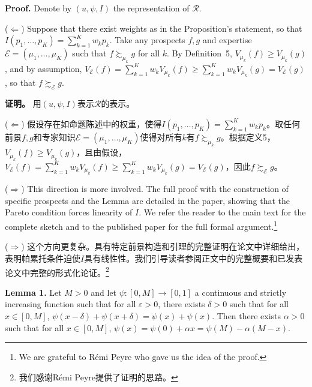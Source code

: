 \documentclass[12pt,a4paper]{article}
\newenvironment{original}
  {\par\noindent\ignorespaces}
  {\par}
\newenvironment{translation}
  {\par\noindent{\color{transblue}\ignorespaces}}
  {\par\medskip}
\begin{document}
\begin{original}
\textbf{Proof.} Denote by $(u, \psi, I)$ the representation of $\mathcal{R}$.

($\Leftarrow$) Suppose that there exist weights as in the Proposition's statement, so that $I(p_{1}, \dots, p_{K}) = \sum_{k=1}^{K} w_{k} p_{k}$. Take any prospects $f, g$ and expertise $\mathcal{E} = (\mu_{1}, \dots, \mu_{K})$ such that $f \succsim_{\mu_{k}} g$ for all $k$. By Definition~5, $V_{\mu_{k}}(f) \geq V_{\mu_{k}}(g)$, and by assumption, $V_{\mathcal{E}}(f) = \sum_{k=1}^{K} w_{k} V_{\mu_{k}}(f) \geq \sum_{k=1}^{K} w_{k} V_{\mu_{k}}(g) = V_{\mathcal{E}}(g)$, so that $f \succsim_{\mathcal{E}} g$.
\end{original}

\begin{translation}
\textbf{证明。} 用$(u, \psi, I)$表示$\mathcal{R}$的表示。

($\Leftarrow$) 假设存在如命题陈述中的权重，使得$I(p_{1}, \dots, p_{K}) = \sum_{k=1}^{K} w_{k} p_{k}$。取任何前景$f, g$和专家知识$\mathcal{E} = (\mu_{1}, \dots, \mu_{K})$使得对所有$k$有$f \succsim_{\mu_{k}} g$。根据定义5，$V_{\mu_{k}}(f) \geq V_{\mu_{k}}(g)$，且由假设，$V_{\mathcal{E}}(f) = \sum_{k=1}^{K} w_{k} V_{\mu_{k}}(f) \geq \sum_{k=1}^{K} w_{k} V_{\mu_{k}}(g) = V_{\mathcal{E}}(g)$，因此$f \succsim_{\mathcal{E}} g$。
\end{translation}

\begin{original}
($\Rightarrow$) This direction is more involved. The full proof with the construction of specific prospects and the Lemma are detailed in the paper, showing that the Pareto condition forces linearity of $I$. We refer the reader to the main text for the complete sketch and to the published paper for the full formal argument.\footnote{We are grateful to R\'{e}mi Peyre who gave us the idea of the proof.}
\end{original}

\begin{translation}
($\Rightarrow$) 这个方向更复杂。具有特定前景构造和引理的完整证明在论文中详细给出，表明帕累托条件迫使$I$具有线性性。我们引导读者参阅正文中的完整概要和已发表论文中完整的形式化论证。\footnote{我们感谢R\'{e}mi Peyre提供了证明的思路。}
\end{translation}

\begin{original}
\textbf{Lemma 1.} Let $M > 0$ and let $\psi: [0, M] \to [0, 1]$ a continuous and strictly increasing function such that for all $\varepsilon > 0$, there exists $\delta > 0$ such that for all $x \in [0, M]$, $\psi(x - \delta) + \psi(x + \delta) = \psi(x) + \psi(x)$. Then there exists $\alpha > 0$ such that for all $x \in [0, M]$, $\psi(x) = \psi(0) + \alpha x = \psi(M) - \alpha(M - x)$.
\end{original}
\end{document}
